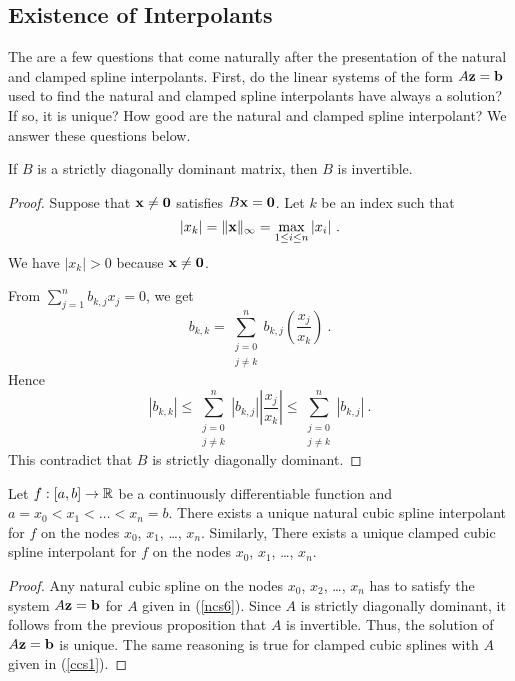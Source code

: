 \subsection{Existence of Interpolants}

The are a few questions that come naturally after the presentation of
the natural and clamped spline interpolants.  First, do the linear
systems of the form $A\mathbf{z} = \mathbf{b}$ used to find the natural and
clamped spline interpolants have always a solution?  If so, it is
unique?  How good are the natural and clamped spline interpolant?
We answer these questions below.

\begin{prop}
If $B$ is a strictly diagonally dominant \nn matrix, then
$B$ is invertible.
\end{prop}

\begin{proof}
Suppose that $\mathbf{x} \neq \mathbf{0}$ satisfies $B\mathbf{x} = \mathbf{0}$.
Let $k$ be an index such that
\[
|x_k| = \|\mathbf{x}\|_\infty = \max_{1\leq i \leq n} |x_i| \ .
\]
We have $|x_k|>0$ because $\mathbf{x}\neq \mathbf{0}$.

From $\displaystyle \sum_{j=1}^n b_{k,j}x_j = 0$, we get
\[
b_{k,k} = \sum_{\substack{j=0\\j\neq k}}^n b_{k,j}
\left(\frac{x_j}{x_k}\right)  \ .
\]
Hence
\[
|b_{k,k}| \leq \sum_{\substack{j=0\\j\neq k}}^n |b_{k,j}|
\left|\frac{x_j}{x_k}\right|
\leq \sum_{\substack{j=0\\j\neq k}}^n |b_{k,j}| \  .
\]
This contradict that $B$ is strictly diagonally dominant.
\end{proof}

\begin{theorem}
Let $f:[a,b]\rightarrow \mathbb{R}$ be a continuously differentiable
function and $a = x_0 < x_1 < \ldots < x_n = b$.  There exists a
unique natural cubic spline interpolant for $f$ on the nodes $x_0$,
$x_1$, \ldots, $x_n$.  Similarly, There exists a unique clamped cubic
spline interpolant for $f$ on the nodes $x_0$, $x_1$, \ldots, $x_n$.
\end{theorem}

\begin{proof}
Any natural cubic spline on the nodes $x_0$, $x_2$, \ldots,
$x_n$ has to satisfy the system $A\mathbf{z} = \mathbf{b}$ for $A$
given in (\ref{ncs6}).  Since $A$ is strictly diagonally dominant, it
follows from the previous proposition that $A$ is invertible.  Thus,
the solution of $A\mathbf{z}=\mathbf{b}$ is unique.  The same reasoning is
true for clamped cubic splines with $A$ given in (\ref{ccs1}).
\end{proof}

